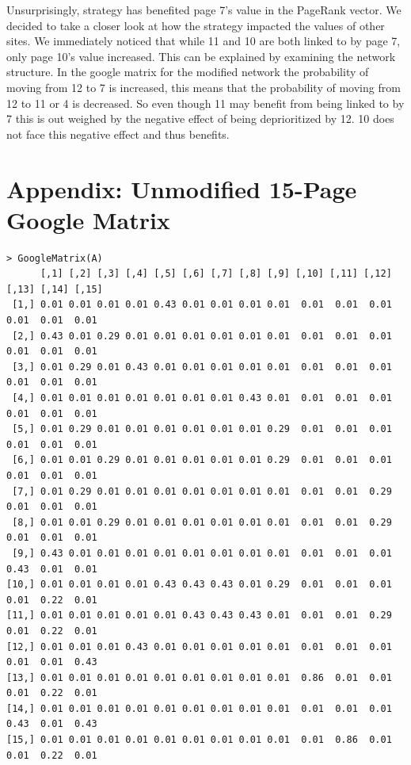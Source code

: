 \documentclass{article}
\begin{document}
Unsurprisingly, strategy has benefited page 7's value in the PageRank vector. We decided to take a closer look at how the strategy impacted the values of other sites. We immediately noticed that while 11 and 10 are both linked to by page 7, only page 10's value increased. This can be explained by examining the network structure. In the google matrix for the modified network the probability of moving from 12 to 7 is increased, this means that the probability of moving from 12 to 11 or 4 is decreased. So even though 11 may benefit from being linked to by 7 this is out weighed by the negative effect of being deprioritized by 12. 10 does not face this negative effect and thus benefits. 




\newpage
\appendix

\section{Appendix: Unmodified 15-Page Google Matrix}
\label{appendix:googlematrix}

\begin{small}
\begin{verbatim}
> GoogleMatrix(A)
      [,1] [,2] [,3] [,4] [,5] [,6] [,7] [,8] [,9] [,10] [,11] [,12] [,13] [,14] [,15]
 [1,] 0.01 0.01 0.01 0.01 0.43 0.01 0.01 0.01 0.01  0.01  0.01  0.01  0.01  0.01  0.01
 [2,] 0.43 0.01 0.29 0.01 0.01 0.01 0.01 0.01 0.01  0.01  0.01  0.01  0.01  0.01  0.01
 [3,] 0.01 0.29 0.01 0.43 0.01 0.01 0.01 0.01 0.01  0.01  0.01  0.01  0.01  0.01  0.01
 [4,] 0.01 0.01 0.01 0.01 0.01 0.01 0.01 0.43 0.01  0.01  0.01  0.01  0.01  0.01  0.01
 [5,] 0.01 0.29 0.01 0.01 0.01 0.01 0.01 0.01 0.29  0.01  0.01  0.01  0.01  0.01  0.01
 [6,] 0.01 0.01 0.29 0.01 0.01 0.01 0.01 0.01 0.29  0.01  0.01  0.01  0.01  0.01  0.01
 [7,] 0.01 0.29 0.01 0.01 0.01 0.01 0.01 0.01 0.01  0.01  0.01  0.29  0.01  0.01  0.01
 [8,] 0.01 0.01 0.29 0.01 0.01 0.01 0.01 0.01 0.01  0.01  0.01  0.29  0.01  0.01  0.01
 [9,] 0.43 0.01 0.01 0.01 0.01 0.01 0.01 0.01 0.01  0.01  0.01  0.01  0.43  0.01  0.01
[10,] 0.01 0.01 0.01 0.01 0.43 0.43 0.43 0.01 0.29  0.01  0.01  0.01  0.01  0.22  0.01
[11,] 0.01 0.01 0.01 0.01 0.01 0.43 0.43 0.43 0.01  0.01  0.01  0.29  0.01  0.22  0.01
[12,] 0.01 0.01 0.01 0.43 0.01 0.01 0.01 0.01 0.01  0.01  0.01  0.01  0.01  0.01  0.43
[13,] 0.01 0.01 0.01 0.01 0.01 0.01 0.01 0.01 0.01  0.86  0.01  0.01  0.01  0.22  0.01
[14,] 0.01 0.01 0.01 0.01 0.01 0.01 0.01 0.01 0.01  0.01  0.01  0.01  0.43  0.01  0.43
[15,] 0.01 0.01 0.01 0.01 0.01 0.01 0.01 0.01 0.01  0.01  0.86  0.01  0.01  0.22  0.01
\end{verbatim}
\end{small}
\end{document}
